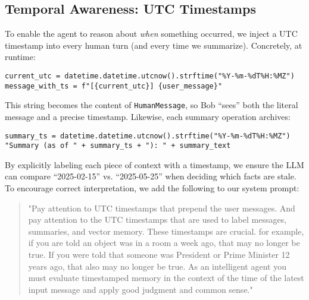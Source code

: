 \documentclass[11pt]{article}
\begin{document}
\subsection{Temporal Awareness: UTC Timestamps}
To enable the agent to reason about \emph{when} something occurred, we inject a UTC timestamp into every human turn (and every time we summarize). Concretely, at runtime:
\begin{verbatim}
current_utc = datetime.datetime.utcnow().strftime("%Y-%m-%dT%H:%MZ")
message_with_ts = f"[{current_utc}] {user_message}"
\end{verbatim}
This string becomes the content of \texttt{HumanMessage}, so Bob “sees” both the literal message and a precise timestamp. Likewise, each summary operation archives:
\begin{verbatim}
summary_ts = datetime.datetime.utcnow().strftime("%Y-%m-%dT%H:%MZ")
"Summary (as of " + summary_ts + "): " + summary_text
\end{verbatim}
By explicitly labeling each piece of context with a timestamp, we ensure the LLM can compare “2025-02-15” vs. “2025-05-25” when deciding which facts are stale. To encourage correct interpretation, we add the following to our system prompt:
\begin{quote}
  "Pay attention to UTC timestamps that prepend the user messages.  And pay attention to the UTC timestamps that are used to label messages, summaries, and vector memory.  These timestamps are crucial.  for example, if you are told an object was in a room a week ago, that may no longer be true.  If you were told that someone was President or Prime Minister 12 years ago, that also may no longer be true.  As an intelligent agent you must evaluate timestamped memory in the context of the time of the latest input message and apply good judgment and common sense."
\end{quote}
\end{document}
